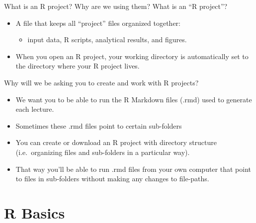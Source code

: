 \documentclass[
  8pt,
  ignorenonframetext,
  dvipsnames]{beamer}
\providecommand{\tightlist}{%
  \setlength{\itemsep}{0pt}\setlength{\parskip}{0pt}}
\let\olditem\item
\renewcommand{\item}{%
  \olditem\vspace{4pt}
}
\begin{document}
\begin{frame}{What is an R project? Why are we using them?}
\protect\hypertarget{what-is-an-r-project-why-are-we-using-them}{}
What is an ``R project''?

\begin{itemize}
\tightlist
\item
  A file that keeps all ``project'' files organized together:

  \begin{itemize}
  \tightlist
  \item
    input data, R scripts, analytical results, and figures.
  \end{itemize}
\item
  When you open an R project, your working directory is automatically
  set to the directory where your R project lives.
\end{itemize}

Why will we be asking you to create and work with R projects?

\begin{itemize}
\tightlist
\item
  We want you to be able to run the R Markdown files (.rmd) used to
  generate each lecture.
\item
  Sometimes these .rmd files point to certain sub-folders
\item
  You can create or download an R project with directory structure
  (i.e.~organizing files and sub-folders in a particular way).
\item
  That way you'll be able to run .rmd files from your own computer that
  point to files in sub-folders without making any changes to
  file-paths.
\end{itemize}
\end{frame}

\hypertarget{r-basics}{%
\section{R Basics}\label{r-basics}}
\end{document}

